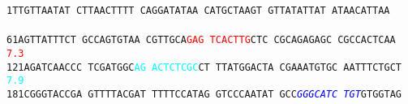 \documentclass[11pt,twoside,reqno,a4paper]{article}
\begin{document}
\texttt{1\hspace*{3\charwidth}TTGTTAATAT	CTTAACTTTT	CAGGATATAA	CATGCTAAGT	GTTATATTAT	ATAACATTAA	\\
\hspace*{4\charwidth}\hspace*{1\charwidth}\hspace*{1\charwidth}\hspace*{1\charwidth}\hspace*{1\charwidth}\hspace*{1\charwidth}\hspace*{1\charwidth}\\
61\hspace*{2\charwidth}AGTTATTTCT	GCCAGTGTAA	CGTTGCA\textcolor{red}{G}\textcolor{red}{A}\textcolor{red}{G}	\textcolor{red}{T}\textcolor{red}{C}\textcolor{red}{A}\textcolor{red}{C}\textcolor{red}{T}\textcolor{red}{T}\textcolor{red}{G}CTC	CGCAGAGAGC	CGCCACTCAA	\\
\hspace*{4\charwidth}\hspace*{1\charwidth}\hspace*{1\charwidth}\hspace*{27\charwidth}\textcolor{red}{7.3}\hspace*{1\charwidth}\hspace*{1\charwidth}\hspace*{1\charwidth}\hspace*{1\charwidth}\\
121\hspace*{1\charwidth}AGATCAACCC	TCGATGGC\textcolor{cyan}{A}\textcolor{cyan}{G}	\textcolor{cyan}{A}\textcolor{cyan}{C}\textcolor{cyan}{T}\textcolor{cyan}{C}\textcolor{cyan}{T}\textcolor{cyan}{C}\textcolor{cyan}{G}\textcolor{cyan}{C}CT	TTATGGACTA	CGAAATGTGC	AATTTCTGCT	\\
\hspace*{4\charwidth}\hspace*{1\charwidth}\hspace*{18\charwidth}\textcolor{cyan}{7.9}\hspace*{1\charwidth}\hspace*{1\charwidth}\hspace*{1\charwidth}\hspace*{1\charwidth}\hspace*{1\charwidth}\\
181\hspace*{1\charwidth}CGGGTACCGA	GTTTTACGAT	TTTTCCATAG	GTCCCAATAT	GCC\textit{\textcolor{blue}{G}}\textit{\textcolor{blue}{G}}\textit{\textcolor{blue}{G}}\textit{\textcolor{blue}{C}}\textit{\textcolor{blue}{A}}\textit{\textcolor{blue}{T}}\textit{\textcolor{blue}{C}}	\textit{\textcolor{blue}{T}}\textit{\textcolor{blue}{G}}\textit{\textcolor{blue}{T}}GTGGTAG	\\
}
\end{document}
